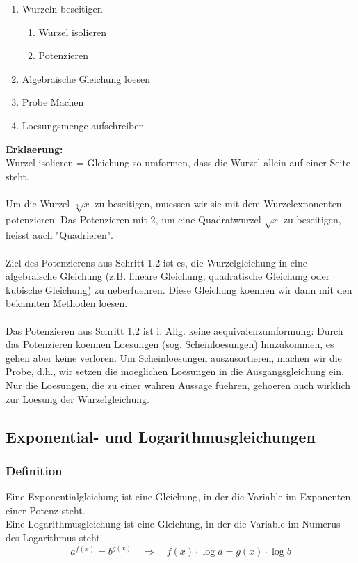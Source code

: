 \begin{multicols}{2}
    \begin{enumerate}
        \item Wurzeln beseitigen
              \begin{enumerate}
                  \item Wurzel isolieren
                  \item Potenzieren
              \end{enumerate}
        \item Algebraische Gleichung loesen
        \item Probe Machen
        \item Loesungsmenge aufschreiben
    \end{enumerate}
    \textbf{Erklaerung:} \\
    Wurzel isolieren = Gleichung so umformen, dass die Wurzel allein auf einer Seite steht. \\~\\
    Um die Wurzel $\sqrt[n]{x}$ zu beseitigen, muessen wir sie mit dem Wurzelexponenten potenzieren. Das Potenzieren mit 2, um eine Quadratwurzel $\sqrt{x}$ zu beseitigen, heisst auch "Quadrieren". \\~\\
    Ziel des Potenzierens aus Schritt 1.2 ist es, die Wurzelgleichung in eine algebraische Gleichung (z.B. lineare Gleichung, quadratische Gleichung oder kubische Gleichung) zu ueberfuehren. Diese Gleichung koennen wir dann mit den bekannten Methoden loesen. \\~\\
    Das Potenzieren aus Schritt 1.2 ist i. Allg. keine aequivalenzumformung: Durch das Potenzieren koennen Loesungen (sog. Scheinloesungen) hinzukommen, es gehen aber keine verloren.
    Um Scheinloesungen auszusortieren, machen wir die Probe, d.h., wir setzen die moeglichen Loesungen in die Ausgangsgleichung ein. Nur die Loesungen, die zu einer wahren Aussage fuehren, gehoeren auch wirklich zur Loesung der Wurzelgleichung.


    \subsection{Exponential- und Logarithmusgleichungen}
    \vspace{-4mm}
    \subsubsection{Definition}
    \vspace{-4mm}
    Eine Exponentialgleichung ist eine Gleichung, in der die Variable im Exponenten einer Potenz steht. \\
    Eine Logarithmusgleichung ist eine Gleichung, in der die Variable im Numerus des Logarithmus steht.
    \[a^{f(x)} = b^{g(x)} \quad \Rightarrow \quad f(x) \cdot \log a = g(x) \cdot \log b\]


\end{multicols}
